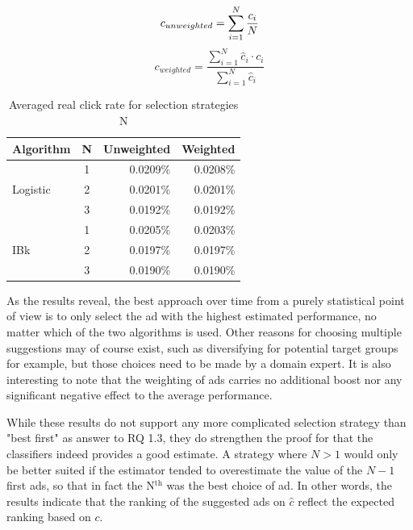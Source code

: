 \documentclass{sig-alternate}
\newcommand{\superscript}[1]{\ensuremath{^{\textrm{#1}}}}
\begin{document}
\begin{equation}
	c_{unweighted} = \sum_{i=1}^{N} \frac{ c_i }{ N } \\
	\label{eq:CUnweighted}
\end{equation}
\begin{equation}
	c_{weighted} = \frac{ \sum_{i=1}^{N} \hat{c}_i \cdot c_i }{ \sum_{i=1}^{N} \hat{c}_i }
	\label{eq:CWeighted}
\end{equation}

\begin{table}
\begin{center}
	\begin{tabular}{ l || c | r  r  }
        \hline
		\textbf{Algorithm} & \textbf{N} & Unweighted & Weighted \\
		\hline
		\multirow{3}{*}{Logistic}
         & 1 & 0.0209\% & 0.0208\% \\
		 & 2 & 0.0201\% & 0.0201\% \\
		 & 3 & 0.0192\% & 0.0192\% \\
         \hline
         \multirow{3}{*}{IBk}
         & 1 & 0.0205\% & 0.0203\% \\
         & 2 & 0.0197\% & 0.0197\% \\
         & 3 & 0.0190\% & 0.0190\% \\
		\hline
	\end{tabular}
	\caption{Averaged real click rate for selection strategies N}
	\label{tbl:SelectionStrategy}
\end{center}
\end{table}

As the results reveal, the best approach over time from a purely statistical point of view is to only select the ad with the highest estimated performance, no matter which of the two algorithms is used. Other reasons for choosing multiple suggestions may of course exist, such as diversifying for potential target groups for example, but those choices need to be made by a domain expert. It is also interesting to note that the weighting of ads carries no additional boost nor any significant negative effect to the average performance.

While these results do not support any more complicated selection strategy than "best first" as answer to RQ 1.3, they do strengthen the proof for that the classifiers indeed provides a good estimate. A strategy where \(N > 1\) would only be better suited if the estimator tended to overestimate the value of the \(N-1\) first ads, so that in fact the N\superscript{th} was the best choice of ad. In other words, the results indicate that the ranking of the suggested ads on \(\hat{c}\) reflect the expected ranking based on \(c\).
\end{document}
